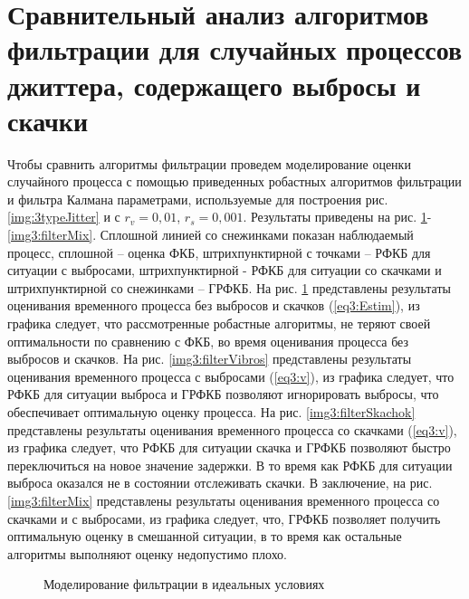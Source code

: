 \section{Сравнительный анализ алгоритмов фильтрации для случайных процессов джиттера, содержащего выбросы и скачки} \label{sect3_6}
Чтобы сравнить алгоритмы фильтрации проведем моделирование оценки случайного процесса с помощью приведенных робастных алгоритмов фильтрации и фильтра Калмана параметрами, 
используемые для построения рис. \ref{img:3typeJitter} и с $r_v=0,01$, $r_s=0,001$. 
Результаты приведены на рис. \ref{img3:filterIdeal}-\ref{img3:filterMix}. 
Сплошной линией со снежинками показан наблюдаемый процесс, 
сплошной – оценка ФКБ, штрихпунктирной с точками – РФКБ для ситуации с выбросами, штрихпунктирной - РФКБ для ситуации со скачками и штрихпунктирной со снежинками – ГРФКБ. 
На рис. \ref{img3:filterIdeal} представлены результаты оценивания временного процесса без выбросов и скачков (\ref{eq3:Estim}), 
из графика следует, что рассмотренные робастные алгоритмы, не теряют своей оптимальности по сравнению с ФКБ, во время оценивания процесса без выбросов и скачков.
На рис. \ref{img3:filterVibros} представлены результаты оценивания временного процесса с выбросами (\ref{eq3:v}), 
из графика следует, что РФКБ для ситуации выброса и ГРФКБ позволяют игнорировать выбросы, что обеспечивает оптимальную оценку процесса.
На рис. \ref{img3:filterSkachok} представлены результаты оценивания временного процесса со скачками (\ref{eq3:v}), 
из графика следует, что РФКБ для ситуации скачка и ГРФКБ позволяют быстро переключиться на новое значение задержки. 
В то время как РФКБ для ситуации выброса оказался не в состоянии отслеживать скачки.
В заключение, на рис. \ref{img3:filterMix} представлены результаты оценивания временного процесса со скачками и с выбросами, из графика следует, что, 
ГРФКБ позволяет получить оптимальную оценку в смешанной ситуации, в то время как остальные алгоритмы выполняют оценку недопустимо плохо.


\pgfplotsset{width=15cm, height=10cm, compat=1.3}
\begin{figure} [!h]
  \center
{}
\caption{Моделирование фильтрации в идеальных условиях}
  \label{img3:filterIdeal}
\end{figure}

